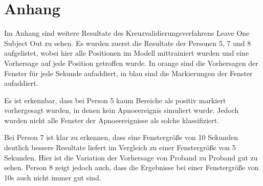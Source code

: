 \chapter{Anhang}
\label{ch:anhang}
Im Anhang sind weitere Resultate des Kreuzvalidierungsverfahrens {\glqq Leave One Subject Out\grqq} zu sehen.
Es wurden zuerst die Resultate der Personen 5, 7 und 8 aufgelistet, wobei hier alle Positionen im Modell mittrainiert wurden und eine Vorhersage auf jede Position getroffen wurde.
In orange sind die Vorhersagen der Fenster für jede Sekunde aufaddiert, in blau sind die Markierungen der Fenster aufaddiert.

Es ist erkennbar, dass bei Person 5 kaum Bereiche als positiv markiert vorhergesagt wurden, in denen kein Apnoeereignis simuliert wurde.
Jedoch wurden nicht alle Fenster der Apnoeereignisse als solche klassifiziert.

Bei Person 7 ist klar zu erkennen, dass eine Fenstergröße von 10 Sekunden deutlich bessere Resultate liefert im Vergleich zu einer Fenstergröße von 5 Sekunden.
Hier ist die Variation der Vorhersage von Proband zu Proband gut zu sehen.
Person 8 zeigt jedoch auch, dass die Ergebnisse bei einer Fenstergröße von 10s auch nicht immer gut sind.

%

